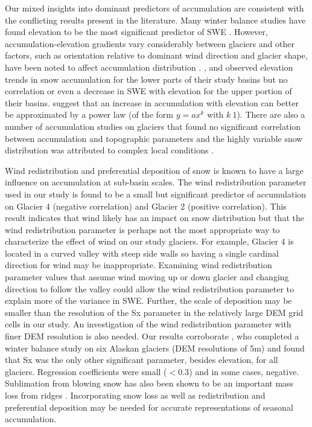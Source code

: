 \documentclass[review,oneside, letterpaper]{igs}
\begin{document}
Our mixed insights into dominant predictors of accumulation are consistent with the conflicting results present in the literature. Many winter balance studies have found elevation to be the most significant predictor of SWE \citep[e.g.][]{Machguth2006, McGrath2015}. However, accumulation-elevation gradients vary considerably between glaciers \citep{Winther1998} and other factors, such as orientation relative to dominant wind direction and glacier shape, have been noted to affect accumulation distribution \citep{Machguth2006,Grabiec2011}.  \cite{Machguth2006}, \cite{Grunewald2014} and \cite{Kirchner2014} observed elevation trends in snow accumulation for the lower parts of their study basins but no correlation or even a decrease in SWE with elevation for the upper portion of their basins. \cite{Helbig2017} suggest that an increase in accumulation with elevation can better be approximated by a power law (of the form $y=ax^k$ with $k\>1$). There are also a number of accumulation studies on glaciers that found no significant correlation between accumulation and topographic parameters and the highly variable snow distribution was attributed to complex local conditions \citep[e.g.][]{Grabiec2011,Lopez2011}.

Wind redistribution and preferential deposition of snow is known to have a large influence on accumulation at sub-basin scales\citep{Dadic2010, Winstral2013}. The wind redistribution parameter used in our study is found to be a small but significant predictor of accumulation on Glacier 4 (negative correlation) and Glacier 2 (positive correlation). This result indicates that wind likely has an impact on snow distribution but that the wind redistribution parameter is perhaps not the most appropriate way to characterize the effect of wind on our study glaciers. For example, Glacier 4 is located in a curved valley with steep side walls so having a single cardinal direction for wind may be inappropriate. Examining wind redistribution parameter values that assume wind moving up or down glacier and changing direction to follow the valley could allow the wind redistribution parameter to explain more of the variance in SWE. Further, the scale of deposition may be smaller than the resolution of the Sx parameter in the relatively large DEM grid cells in our study. An investigation of the wind redistribution parameter with finer DEM resolution is also needed. Our results corroborate \cite{McGrath2015}, who completed a winter balance study on six Alaskan glaciers (DEM resolutions of 5m) and found that Sx was the only other significant parameter, besides elevation, for all glaciers. Regression coefficients were small ($<0.3$) and in some cases, negative. Sublimation from blowing snow has also been shown to be an important mass loss from ridges \citep{Musselman2015}. Incorporating snow loss as well as redistribution and preferential deposition may be needed for accurate representations of seasonal accumulation. 
\end{document}
